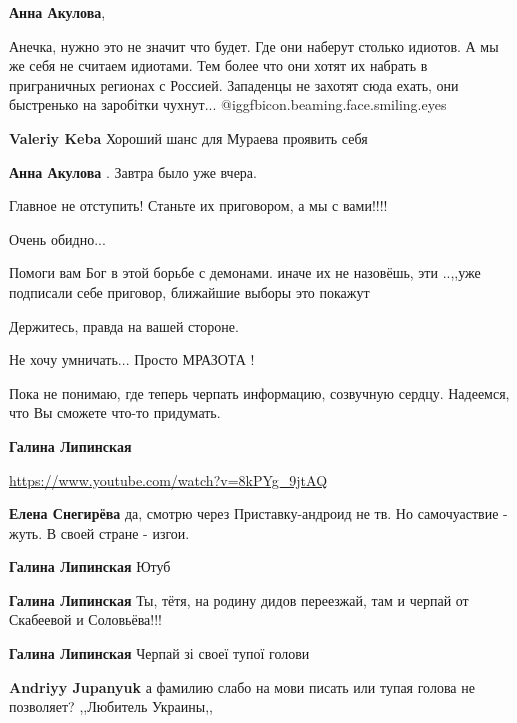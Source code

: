 \begin{itemize}
\begin{itemize}
\textbf{Анна Акулова}, 

Анечка, нужно это не значит что будет. Где они наберут столько идиотов. А мы же
себя не считаем идиотами. Тем более что они хотят их набрать в приграничных
регионах с Россией. Западенцы не захотят сюда ехать, они быстренько на
заробітки чухнут...  @igg{fbicon.beaming.face.smiling.eyes} 

\textbf{Valeriy Keba} Хороший шанс для Мураева проявить себя

\textbf{Анна Акулова} .
Завтра было уже вчера.

\end{itemize} %

Главное не отступить! Станьте их приговором, а мы с вами!!!!

Очень обидно...

Помоги вам Бог в этой борьбе с демонами. иначе их не назовёшь, эти ..,,уже
подписали себе приговор, ближайшие выборы это покажут

Держитесь, правда на вашей стороне.

Не хочу умничать...
Просто МРАЗОТА !

Пока не понимаю, где теперь черпать информацию, созвучную сердцу. Надеемся, что
Вы сможете что-то придумать.

\begin{itemize} %
\textbf{Галина Липинская} 

\url{https://www.youtube.com/watch?v=8kPYg_9jtAQ}

\textbf{Елена Снегирёва} да, смотрю через
Приставку-андроид не тв.
Но самочуаствие - жуть. В своей стране - изгои.

\textbf{Галина Липинская} Ютуб

\textbf{Галина Липинская} Ты, тётя, на родину дидов переезжай, там и черпай от Скабеевой и Соловьёва!!!

\textbf{Галина Липинская} Черпай зі своеї тупої голови

\textbf{Andriyy Jupanyuk} а фамилию слабо на мови писать или тупая голова не позволяет? ,,Любитель Украины,,

\end{itemize} %


\end{itemize}
